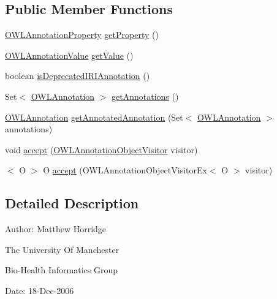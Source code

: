 \subsection*{Public Member Functions}
\begin{DoxyCompactItemize}
\item 
\hyperlink{interfaceorg_1_1semanticweb_1_1owlapi_1_1model_1_1_o_w_l_annotation_property}{O\-W\-L\-Annotation\-Property} \hyperlink{interfaceorg_1_1semanticweb_1_1owlapi_1_1model_1_1_o_w_l_annotation_a38d2bcdefcf387bee8195c5547e37bda}{get\-Property} ()
\item 
\hyperlink{interfaceorg_1_1semanticweb_1_1owlapi_1_1model_1_1_o_w_l_annotation_value}{O\-W\-L\-Annotation\-Value} \hyperlink{interfaceorg_1_1semanticweb_1_1owlapi_1_1model_1_1_o_w_l_annotation_a150cbe1cc0fddb7b9e749534a9d7dd0d}{get\-Value} ()
\item 
boolean \hyperlink{interfaceorg_1_1semanticweb_1_1owlapi_1_1model_1_1_o_w_l_annotation_a75a8495197da05e8a2b6c5bc6661aee8}{is\-Deprecated\-I\-R\-I\-Annotation} ()
\item 
Set$<$ \hyperlink{interfaceorg_1_1semanticweb_1_1owlapi_1_1model_1_1_o_w_l_annotation}{O\-W\-L\-Annotation} $>$ \hyperlink{interfaceorg_1_1semanticweb_1_1owlapi_1_1model_1_1_o_w_l_annotation_a4a91857dd9268f638c1c664a9e739092}{get\-Annotations} ()
\item 
\hyperlink{interfaceorg_1_1semanticweb_1_1owlapi_1_1model_1_1_o_w_l_annotation}{O\-W\-L\-Annotation} \hyperlink{interfaceorg_1_1semanticweb_1_1owlapi_1_1model_1_1_o_w_l_annotation_a6d35da93afdcaa79c77d605d6609df2e}{get\-Annotated\-Annotation} (Set$<$ \hyperlink{interfaceorg_1_1semanticweb_1_1owlapi_1_1model_1_1_o_w_l_annotation}{O\-W\-L\-Annotation} $>$ annotations)
\item 
void \hyperlink{interfaceorg_1_1semanticweb_1_1owlapi_1_1model_1_1_o_w_l_annotation_a0f9541dd4ba3faf39b12c1cc1c59f739}{accept} (\hyperlink{interfaceorg_1_1semanticweb_1_1owlapi_1_1model_1_1_o_w_l_annotation_object_visitor}{O\-W\-L\-Annotation\-Object\-Visitor} visitor)
\item 
$<$ O $>$ O \hyperlink{interfaceorg_1_1semanticweb_1_1owlapi_1_1model_1_1_o_w_l_annotation_aa03b6ab495b6760ff995eb6bc146a816}{accept} (O\-W\-L\-Annotation\-Object\-Visitor\-Ex$<$ O $>$ visitor)
\end{DoxyCompactItemize}


\subsection{Detailed Description}
Author\-: Matthew Horridge\par
 The University Of Manchester\par
 Bio-\/\-Health Informatics Group\par
 Date\-: 18-\/\-Dec-\/2006\par
\par
 

